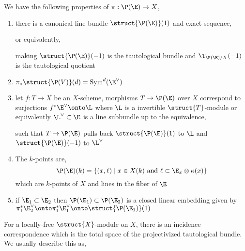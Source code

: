 \documentclass[12pt]{article}
\begin{document}
\begin{rmk}
We have the following properties of $\pi : \P(\E) \to X$,
\begin{enumerate}
\item there is a canonical line bundle $\struct{\P(\E)}(1)$ and exact sequence,
\begin{center}
\end{center}
or equivalently,
\begin{center}
\end{center}
making $\struct{\P(\E)}(-1)$ is the tautological bundle and $\T_{\P(\E)/X}(-1)$ is the tautological quotient
\item $\pi_* \struct{\P(V)}(d) = \mathrm{Sym}^d(\E^\vee)$
\item let $f : T \to  X$ be an $X$-scheme, morphisms $T \to \P(\E)$ over $X$ correspond to surjections $f^* \E^\vee \onto \L$ where $\L$ is a invertible $\struct{T}$-module or equivalently $\L^\vee \subset \E$ is a line subbundle up to the equivalence,
\begin{center}
\end{center}
such that $T \to \P(\E)$ pulls back $\struct{\P(\E)}(1)$ to $\L$ and $\struct{\P(\E)}(-1)$ to $\L^\vee$
\item The $k$-points are,
\[ \P(\E)(k) = \{ (x, \ell) \mid x \in X(k) \text{ and } \ell \subset \E_x \otimes \kappa(x) \} \]
which are $k$-points of $X$ and lines in the fiber of $\E$
\item if $\E_1 \subset \E_2$ then $\P(\E_1) \subset \P(\E_2)$ is a closed linear embedding given by $\pi_1^* \E_2^\vee \onto \pi_1^* \E_1^\vee \onto \struct{\P(\E_1)}(1)$
\end{enumerate} 
\end{rmk}
\noindent
For a locally-free $\struct{X}$-module on $X$, there is an incidence correspondence which is the total space of the projectivized tautological bundle. We usually describe this as,
\end{document}
